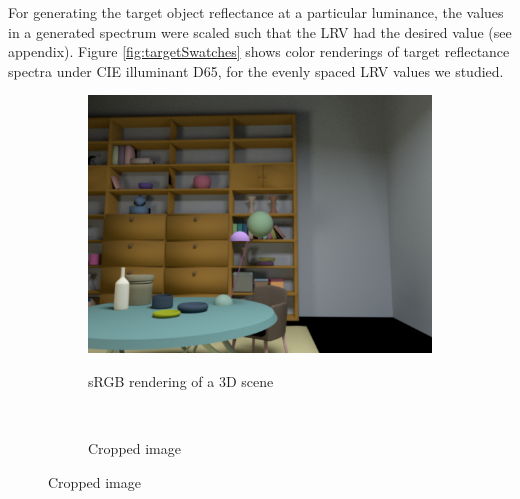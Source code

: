 \documentclass{jov}
\begin{document}
For generating the target object reflectance at a particular luminance, the values in a generated spectrum were 
scaled such that the LRV had the desired value (see appendix).
Figure \ref{fig:targetSwatches} shows color renderings of target reflectance spectra under CIE illuminant D65, for the evenly spaced LRV values we studied.

\begin{figure}
\centering
\begin{subfigure}[b]{0.25 \textwidth}
		\centering
        \caption{sRGB rendering of a 3D scene}
        \includegraphics[width=\textwidth]{../FiguresDraft4/Figure9/Figure9_a.png}
        \label{fig:3DScene}
    \end{subfigure}
    ~ 
    \begin{subfigure}[b]{0.19 \textwidth}   
    \hspace{0.1 \textwidth}
        \caption{Cropped image}
        \vspace{1.5mm}

\end{subfigure}
\end{figure}
\end{document}
